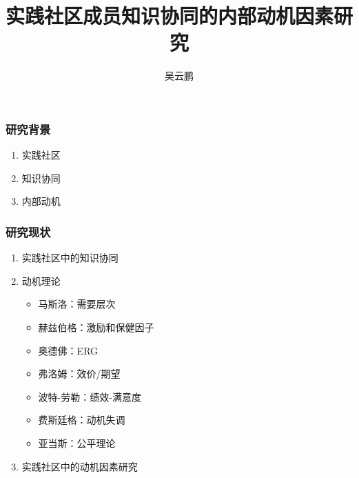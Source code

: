\documentclass[slidestop,compress,mathserif,blue,compress]{beamer}
\title{实践社区成员知识协同的内部动机因素研究}
\author{吴云鹏}
\institute{北京航空航天大学 \\ 经济管理学院}
\begin{document}
\begin{frame}
\titlepage
\end{frame}

\begin{frame}
  \frametitle{研究背景}
  \begin{enumerate}
  \item 实践社区
   \item 知识协同
   \item  内部动机
  \end{enumerate}
\end{frame}

\begin{frame}[shrink]
  \frametitle{研究现状}
  \begin{enumerate}
  \item  实践社区中的知识协同
  \item  动机理论
    \begin{itemize}
    \item 马斯洛：需要层次
\item 赫兹伯格：激励和保健因子
\item  奥德佛：ERG
\item   弗洛姆：效价/期望
\item     波特-劳勒：绩效-满意度
   \item 费斯廷格：动机失调
\item   亚当斯：公平理论

    \end{itemize}
  
 
   
    
 
    
  \item  实践社区中的动机因素研究
  \end{enumerate}

\end{frame}
\end{document}
